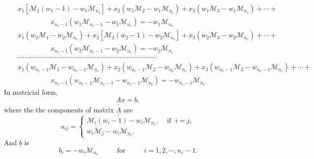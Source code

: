   \begin{eqnarray}
    && x_{1}\left[\mathcal{M}_{1}\left(w_{1}-1\right)-w_{1}\mathcal{M}_{n_{c}}\right] + x_{2}\left(w_{1}\mathcal{M}_{2}-w_{1}\mathcal{M}_{n_{c}}\right) + x_{3}\left(w_{1}\mathcal{M}_{3}-w_{1}\mathcal{M}_{n_{c}}\right) + \cdots + \nonumber \\
    &&  \hspace{2cm} x_{n_{c}-1}\left(w_{1}\mathcal{M}_{n_{c}-1}-w_{1}\mathcal{M}_{n_{c}}\right) = -w_{1}\mathcal{M}_{n_{c}} \nonumber \\
    && x_{1}\left(w_{2}\mathcal{M}_{1}-w_{2}\mathcal{M}_{n_{c}}\right) + x_{2}\left[\mathcal{M}_{2}\left(w_{2}-1\right)-w_{2}\mathcal{M}_{n_{c}}\right] + x_{3}\left(w_{2}\mathcal{M}_{3}-w_{2}\mathcal{M}_{n_{c}}\right) + \cdots + \nonumber \\
    &&  \hspace{2cm} x_{n_{c}-1}\left(w_{2}\mathcal{M}_{n_{c}-1}-w_{2}\mathcal{M}_{n_{c}}\right) = -w_{2}\mathcal{M}_{n_{c}} \nonumber \\
    &&\cdots\cdots\cdots\cdots\cdots\cdots\cdots\cdots\cdots\cdots\cdots\cdots\cdots\cdots\cdots\cdots\cdots\cdots\cdots\cdots\cdots\cdots\cdots\cdots\cdots\cdots \nonumber \\
    && x_{1}\left(w_{n_{c}-1}\mathcal{M}_{1}-w_{n_{c}-1}\mathcal{M}_{n_{c}}\right) + x_{2}\left(w_{n_{c}-1}\mathcal{M}_{2}-w_{n_{c}}\mathcal{M}_{n_{c}}\right) + x_{3}\left(w_{n_{c}-1}\mathcal{M}_{3}-w_{n_{c}-1}\mathcal{M}_{n_{c}}\right) + \cdots + \nonumber \\
    &&  \hspace{2cm} x_{n_{c}-1}\left(w_{n_{c}-1}\mathcal{M}_{n_{c}-1}-w_{n_{c}-1}\mathcal{M}_{n_{c}}\right) = -w_{n_{c}-1}\mathcal{M}_{n_{c}} \nonumber 
  \end{eqnarray}
In matricial form,
   \begin{displaymath}
      \underline{\underline{A}}\underline{x} = \underline{b},
   \end{displaymath}
where the the components of matrix $\underline{\underline{A}}$ are
   \begin{displaymath}
      a_{ij} = 
        \begin{cases}
           \mathcal{M}_{i}\left(w_{i}-1\right) - w_{i}\mathcal{M}_{n_{c}}, & \text{ if }\; i=j, \\
           w_{i}\mathcal{M}_{j} - w_{i}\mathcal{M}_{n_{c}}. & 
        \end{cases}
   \end{displaymath}
And $\underline{b}$ is
   \begin{displaymath}
      b_{i} = -w_{i}\mathcal{M}_{n_{c}} \hspace{1cm}\text{ for } \hspace{1cm} i=1,2,\cdots,n_{c}-1.
   \end{displaymath}
